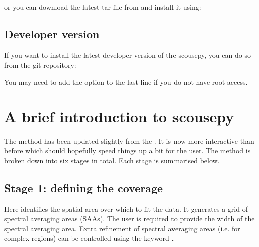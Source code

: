 \documentclass[letterpaper,10pt,english]{sphinxmanual}
\let\sphinxpxdimen\pdfpxdimen\else\newdimen\sphinxpxdimen
\begin{document}
or you can download the latest tar file from
 and install it using:

\begin{sphinxVerbatim}[commandchars=\\\{\}]
  
\end{sphinxVerbatim}


\subsection{Developer version}
\label{\detokenize{installation:developer-version}}
If you want to install the latest developer version of the scousepy, you can do
so from the git repository:

\begin{sphinxVerbatim}[commandchars=\\\{\}]
  
 
  
\end{sphinxVerbatim}

You may need to add the  option to the last line if you do not have
root access.


\section{A brief introduction to scousepy}
\label{\detokenize{description:a-brief-introduction-to-scousepy}}\label{\detokenize{description:introduction}}\label{\detokenize{description::doc}}
The method has been updated slightly from the . It is now more interactive than
before which should hopefully speed things up a bit for the user. The method
is broken down into six stages in total. Each stage is summarised below.

\noindent{\hspace*{\fill}\sphinxincludegraphics[width=850\sphinxpxdimen]{{Figure_cartoon}.png}\hspace*{\fill}}


\subsection{Stage 1: defining the coverage}
\label{\detokenize{description:stage-1-defining-the-coverage}}
Here  identifies the spatial area over which to fit the data. It
generates a grid of spectral averaging areas (SAAs). The user is required to
provide the width of the spectral averaging area. Extra refinement of spectral
averaging areas (i.e. for complex regions) can be controlled using the keyword
.
\end{document}
